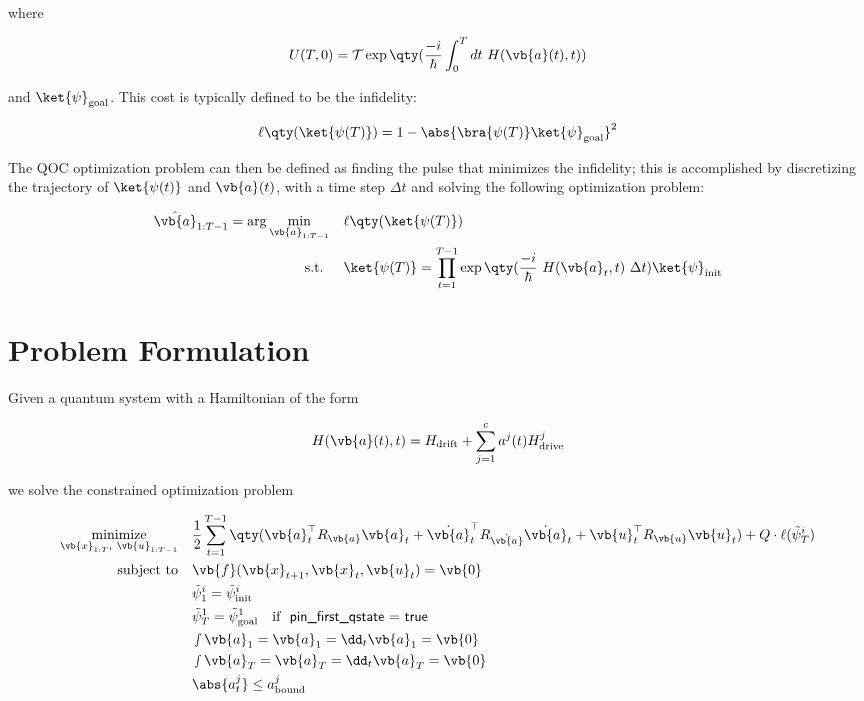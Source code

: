 \documentclass{article}
\newcommand{\isopsi}{\tilde \psi}
\begin{document}
where

\begin{equation}
  U(T, 0) = \mathcal{T} \exp \qty( \frac{-i}{\hbar} \int_0^T dt \ H(\vb{a}(t), t)) 
\end{equation}

and $\ket{\psi}_{\text{goal}}$. This cost is typically defined to be the infidelity:

\begin{equation}
  \ell \qty(\ket{\psi(T)}) = 1 - \abs{\bra{\psi(T)} \ket{\psi}_{\text{goal}}}^2
\end{equation}

The QOC optimization problem can then be defined as finding the pulse that minimizes the infidelity; this is accomplished by discretizing the trajectory of $\ket{\psi(t)}$ and $\vb{a}(t)$, with a time step $\Delta t$ and solving the following optimization problem:

\begin{align*}
  \hat{\vb{a}}_{1:T-1} = \arg \min_{\vb{a}_{1:T-1}} \quad &\ell \qty(\ket{\psi(T)})\\
  \text{s.t. } \quad 
    & \ket{\psi(T)} = \prod_{t=1}^{T-1} \exp \qty( \frac{-i}{\hbar} \ H(\vb{a}_t, t) \ \Delta t) \ket{\psi}_{\text{init}} \\
\end{align*}



\section{Problem Formulation}

Given a quantum system with a Hamiltonian of the form

$$
H(\vb{{a}}(t), t ) = H_{\text{drift}} + \sum_{j=1}^c a^j(t) H_{\text{drive}}^j
$$

we solve the constrained optimization problem

\begin{align*}
  \underset{\vb{x}_{1:T}, \ \vb{u}_{1:T-1}}{\text{minimize}} \quad
    & \frac{1}{2} \sum_{t=1}^{T-1} \qty(\vb{a}_t^\top R_{\vb{a}} \vb{a}_t + \dot{\vb{a}}_t^\top R_{\dot{\vb{a}}} \dot{\vb{a}}_t + \vb{u}_t^\top R_{\vb{u}} \vb{u}_t) + Q \cdot \ell(\isopsi_T^i)\\ 
  \text{subject to} \quad 
    & \vb{f}(\vb{x}_{t+1}, \vb{x}_t, \vb{u}_t) = \vb{0}  \\
    &  \isopsi^i_1 = \isopsi^i_\text{init} \\
    & \isopsi^1_T = \isopsi^1_\text{goal} \quad \text{if }\ \textsf{pin\_first\_qstate = true}\\
    & \smallint \vb{a}_1 = \vb{a}_1 = \dd_t \vb{a}_1 = \vb{0} \\  
    & \smallint \vb{a}_T = \vb{a}_T = \dd_t \vb{a}_T = \vb{0} \\
    & \abs{a^j_t} \leq a^j_\text{bound} \\
\end{align*}
\end{document}
